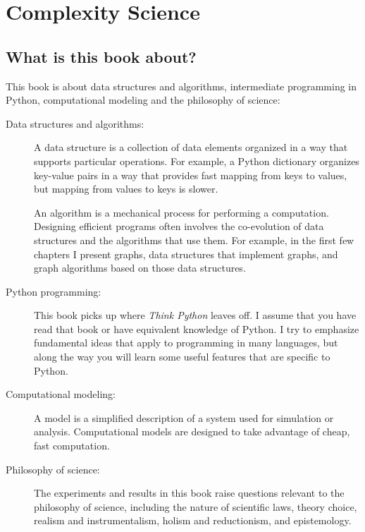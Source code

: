 \documentclass[10pt]{book}
\begin{document}
\normalsize

\clearemptydoublepage

\begin{latexonly}

\tableofcontents

\clearemptydoublepage

\end{latexonly}

\mainmatter

\chapter{Complexity Science}
\label{overview}

\section{What is this book about?}

This book is about data structures and algorithms, intermediate
programming in Python, computational modeling and the philosophy of
science:

\begin{description}

\item[Data structures and algorithms:] A data structure is a
  collection of data elements organized in a way that supports
  particular operations.  For example, a Python dictionary organizes
  key-value pairs in a way that provides fast mapping from keys to
  values, but mapping from values to keys is slower.

An algorithm is a mechanical process for performing a computation.
Designing efficient programs often involves the co-evolution of data
structures and the algorithms that use them.  For example, in the
first few chapters I present graphs, data structures that
implement graphs, and graph algorithms based on those data structures.

\item[Python programming:] This book picks up where {\em Think Python}
  leaves off.  I assume that you have read that book or have
  equivalent knowledge of Python.  I try to emphasize fundamental ideas
  that apply to programming in many languages, but along the way you
  will learn some useful features that are specific to Python.

\item[Computational modeling:] A model is a simplified
  description of a system used for simulation or analysis.
  Computational models are designed to take advantage of cheap, fast
  computation.

\item[Philosophy of science:] The experiments and results in this book
  raise questions relevant to the philosophy of science,
  including the nature of scientific laws, theory choice, realism and
  instrumentalism, holism and reductionism, and epistemology.

\end{description}
\end{document}
